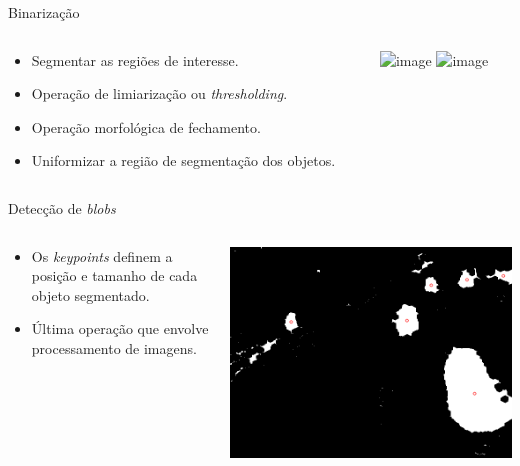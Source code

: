 \begin{frame}{Binarização}
  \begin{columns}[T]
    \begin{column}{.5\textwidth}
      \begin{itemize}
        \item<1-> Segmentar as regiões de interesse.
        \item<1-> Operação de limiarização ou \textit{thresholding}.
        \item<2-> Operação morfológica de fechamento.
        \item<2-> Uniformizar a região de segmentação dos objetos.
      \end{itemize}
    \end{column}
    \begin{column}{.5\textwidth}
      \begin{block}{}
        \includegraphics<1>[width=\textwidth]{imgs/bin.png}
        \includegraphics<2>[width=\textwidth]{imgs/morph.png}
      \end{block}
    \end{column}
  \end{columns}
\end{frame}

\begin{frame}{Detecção de \textit{blobs}}
  \begin{columns}[T]
    \begin{column}{.5\textwidth}
      \begin{itemize}
        \item Os \textit{keypoints} definem a posição e tamanho de cada objeto segmentado.
        \item Última operação que envolve processamento de imagens.
      \end{itemize}
    \end{column}
    \begin{column}{.5\textwidth}
      \begin{block}{}
        \includegraphics[width=\textwidth]{imgs/keypoints.png}
      \end{block}
    \end{column}
  \end{columns}
\end{frame}

